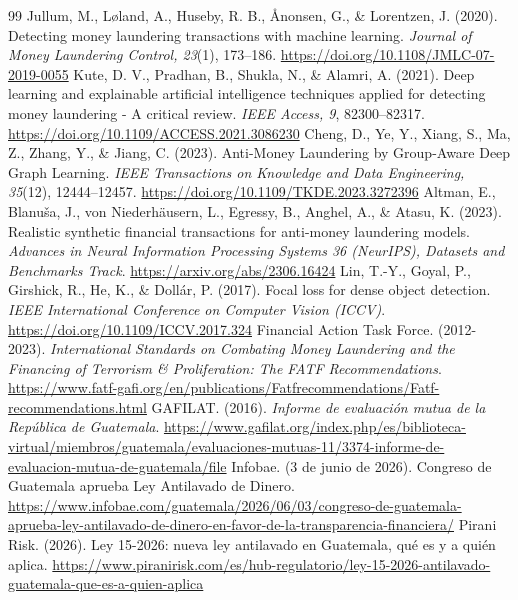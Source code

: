 \documentclass[11pt,a4paper]{article}
\begin{document}
\begin{thebibliography}{99}
\small
{} Jullum, M., Løland, A., Huseby, R. B., Ånonsen, G., \& Lorentzen, J. (2020). Detecting money laundering transactions with machine learning. \textit{Journal of Money Laundering Control, 23}(1), 173--186. \url{https://doi.org/10.1108/JMLC-07-2019-0055}
 Kute, D. V., Pradhan, B., Shukla, N., \& Alamri, A. (2021). Deep learning and explainable artificial intelligence techniques applied for detecting money laundering - A critical review. \textit{IEEE Access, 9}, 82300--82317. \url{https://doi.org/10.1109/ACCESS.2021.3086230}
 Cheng, D., Ye, Y., Xiang, S., Ma, Z., Zhang, Y., \& Jiang, C. (2023). Anti-Money Laundering by Group-Aware Deep Graph Learning. \textit{IEEE Transactions on Knowledge and Data Engineering, 35}(12), 12444--12457. \url{https://doi.org/10.1109/TKDE.2023.3272396}
 Altman, E., Blanuša, J., von Niederhäusern, L., Egressy, B., Anghel, A., \& Atasu, K. (2023). Realistic synthetic financial transactions for anti-money laundering models. \textit{Advances in Neural Information Processing Systems 36 (NeurIPS), Datasets and Benchmarks Track}. \url{https://arxiv.org/abs/2306.16424}
 Lin, T.-Y., Goyal, P., Girshick, R., He, K., \& Dollár, P. (2017). Focal loss for dense object detection. \textit{IEEE International Conference on Computer Vision (ICCV)}. \url{https://doi.org/10.1109/ICCV.2017.324}
 Financial Action Task Force. (2012-2023). \textit{International Standards on Combating Money Laundering and the Financing of Terrorism \& Proliferation: The FATF Recommendations}. \url{https://www.fatf-gafi.org/en/publications/Fatfrecommendations/Fatf-recommendations.html}
 GAFILAT. (2016). \textit{Informe de evaluación mutua de la República de Guatemala}. \url{https://www.gafilat.org/index.php/es/biblioteca-virtual/miembros/guatemala/evaluaciones-mutuas-11/3374-informe-de-evaluacion-mutua-de-guatemala/file}
 Infobae. (3 de junio de 2026). Congreso de Guatemala aprueba Ley Antilavado de Dinero. \url{https://www.infobae.com/guatemala/2026/06/03/congreso-de-guatemala-aprueba-ley-antilavado-de-dinero-en-favor-de-la-transparencia-financiera/}
 Pirani Risk. (2026). Ley 15-2026: nueva ley antilavado en Guatemala, qué es y a quién aplica. \url{https://www.piranirisk.com/es/hub-regulatorio/ley-15-2026-antilavado-guatemala-que-es-a-quien-aplica}
\end{thebibliography}
\end{document}
